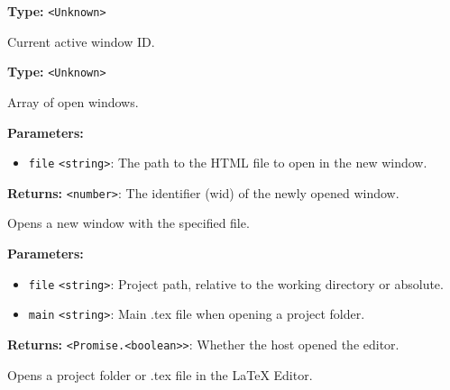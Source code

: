 \documentclass[12pt,a4paper]{article}
\begin{document}
\noindent \textbf{Type:} \texttt{<Unknown>}

\noindent Current active window ID.

\vspace{5mm}
\noindent {}\vspace{4mm}


\noindent \textbf{Type:} \texttt{<Unknown>}

\noindent Array of open windows.

\vspace{5mm}
\noindent {}


\noindent \textbf{Parameters:}
\begin{itemize}
  \item \texttt{file} \texttt{<string>}: The path to the HTML file to open in the new window.
\end{itemize}

\noindent \textbf{Returns:} \texttt{<number>}: The identifier (wid) of the newly opened window.

\noindent Opens a new window with the specified file.

\vspace{5mm}
\noindent {}


\noindent \textbf{Parameters:}
\begin{itemize}
  \item \texttt{file} \texttt{<string>}: Project path, relative to the working directory or absolute.
  \item \texttt{main} \texttt{<string>}: Main .tex file when opening a project folder.
\end{itemize}

\noindent \textbf{Returns:} \texttt{<Promise.<boolean>>}: Whether the host opened the editor.

\noindent Opens a project folder or .tex file in the LaTeX Editor.

\vspace{5mm}
\noindent {}
\end{document}
